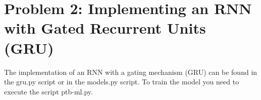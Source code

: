 \section{Problem 2: Implementing an RNN with Gated Recurrent Units (GRU)}

The implementation of an RNN with a gating mechanism (GRU) can be found in the gru.py script or in the models.py script. To train the model you need to execute the script ptb-ml.py.
